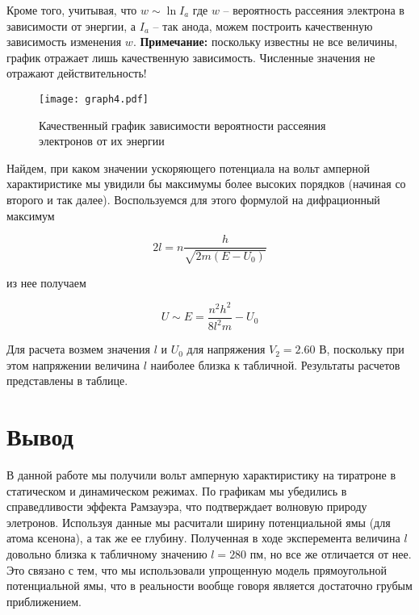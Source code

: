     Кроме того, учитывая, что $w \sim \ln I_a$ где $w$ -- вероятность рассеяния электрона в зависимости от энергии, а $I_a$ --
    так анода, можем построить качественную зависимость изменения $w$. \textbf{Примечание:} поскольку известны не все величины,
    график отражает лишь качественную зависимость. Численные значения не отражают действительность!

    \begin{figure}
        \centering
        \texttt{[image: graph4.pdf]}
        \caption{Качественный график зависимости вероятности рассеяния электронов от их энергии}
        \label{fig:graph4}
    \end{figure}

    Найдем, при каком значении ускоряющего потенциала на вольт амперной характиристике мы увидили бы максимумы более высоких
    порядков (начиная со второго и так далее). Воспользуемся для этого формулой на дифрационный максимум

    \begin{equation}
        2 l = n \frac{h}{\sqrt{2m (E - U_0)}}
    \end{equation}

    из нее получаем

    \begin{equation}
        U \sim E = \frac{n^2 h^2}{8 l^2 m} - U_0
    \end{equation}

    Для расчета возмем значения $l$ и $U_0$ для напряжения $V_2 = 2.60$ В, поскольку при этом напряжении величина $l$ наиболее
    близка к табличной. Результаты расчетов представлены в таблице.

    

    \section*{Вывод}

    В данной работе мы получили вольт амперную характиристику на тиратроне в статическом и динамическом режимах.
    По графикам мы убедились в справедливости эффекта Рамзауэра, что подтверждает волновую природу элетронов. Используя 
    данные мы расчитали ширину потенциальной ямы (для атома ксенона), а так же ее глубину. Полученная в ходе эксперемента
    величина $l$ довольно близка к табличному значению $l = 280$ пм, но все же отличается от нее. Это связано с тем, что
    мы использовали упрощенную модель прямоугольной потенциальной ямы, что в реальности вообще говоря является достаточно грубым
    приближением.

